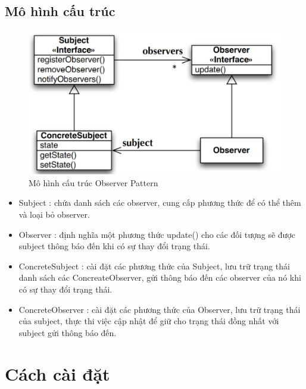 \subsection{Mô hình cấu trúc}
\begin{figure}[!htb]
    \centering
    \includegraphics[width=\textwidth]{fig/Observer/structure_observer.png}
    \caption{Mô hình cấu trúc Observer Pattern}
    \label{fig:structure_observer}
\end{figure}
\begin{itemize}
     \item Subject : chứa danh sách các observer,  cung cấp phương thức để có thể thêm và loại bỏ observer.
    \item Observer : định nghĩa một phương thức update() cho các đối tượng sẽ được subject thông báo đến khi có sự thay đổi trạng thái.
    \item ConcreteSubject : cài đặt các phương thức của Subject, lưu trữ trạng thái danh sách các ConcreateObserver, gửi thông báo đến các observer của nó khi có sự thay đổi trạng thái.
    \item ConcreteObserver : cài đặt các phương thức của Observer, lưu trữ trạng thái của subject, thực thi việc cập nhật để giữ cho trạng thái đồng nhất với subject gửi thông báo đến.
\end{itemize}

\section{Cách cài đặt}
